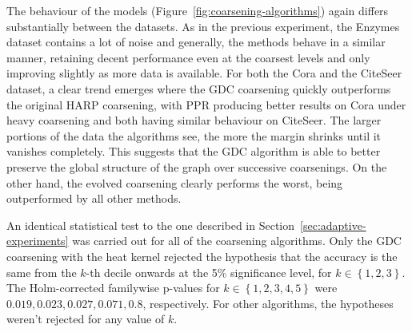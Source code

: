 The behaviour of the models (Figure~\ref{fig:coarsening-algorithms}) again differs substantially between the datasets. As in the previous experiment, the Enzymes dataset contains a lot of noise and generally, the methods behave in a similar manner, retaining decent performance even at the coarsest levels and only improving slightly as more data is available. For both the Cora and the CiteSeer dataset, a clear trend emerges where the GDC coarsening quickly outperforms the original HARP coarsening, with PPR producing better results on Cora under heavy coarsening and both having similar behaviour on CiteSeer. The larger portions of the data the algorithms see, the more the margin shrinks until it vanishes completely. This suggests that the GDC algorithm is able to better preserve the global structure of the graph over successive coarsenings. On the other hand, the evolved coarsening clearly performs the worst, being outperformed by all other methods.

An identical statistical test to the one described in Section~\ref{sec:adaptive-experiments} was carried out for all of the coarsening algorithms. Only the GDC coarsening with the heat kernel rejected the hypothesis that the accuracy is the same from the \( k \)-th decile onwards at the 5\% significance level, for \( k \in \left\{ 1, 2, 3 \right\} \). The Holm-corrected familywise p-values for \( k \in \left\{ 1, 2, 3, 4, 5 \right\} \) were \( 0.019, 0.023, 0.027, 0.071, 0.8 \), respectively. For other algorithms, the hypotheses weren't rejected for any value of \( k \).
